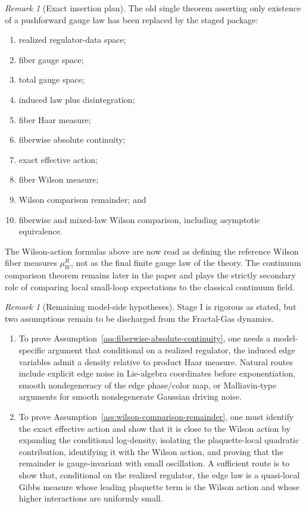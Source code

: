 \documentclass[11pt]{article}
\theoremstyle{definition}
\theoremstyle{remark}
\newtheorem{remark}[theorem]{Remark}
\begin{document}
\begin{remark}[Exact insertion plan]
\label{rem:stage1-insertion-plan}
The old single theorem asserting only existence of a pushforward gauge law has
been replaced by the staged package:
\begin{enumerate}[leftmargin=1.5em,label=\textnormal{(\roman*)}]
\item realized regulator-data space;
\item fiber gauge space;
\item total gauge space;
\item induced law plus disintegration;
\item fiber Haar measure;
\item fiberwise absolute continuity;
\item exact effective action;
\item fiber Wilson measure;
\item Wilson comparison remainder; and
\item fiberwise and mixed-law Wilson comparison, including asymptotic equivalence.
\end{enumerate}
The Wilson-action formulas above are now read as defining the reference Wilson
fiber measures \(\mu_W^R\), not as the final finite gauge law of the theory.
The continuum comparison theorem remains later in the paper and plays the
strictly secondary role of comparing local small-loop expectations to the
classical continuum field.
\end{remark}

\begin{remark}[Remaining model-side hypotheses]
\label{rem:remaining-model-side-hypotheses}
Stage I is rigorous as stated, but two assumptions remain to be discharged from
the Fractal-Gas dynamics.
\begin{enumerate}[leftmargin=1.5em,label=\textnormal{(\roman*)}]
\item To prove Assumption~\ref{ass:fiberwise-absolute-continuity}, one needs a
model-specific argument that conditional on a realized regulator, the induced
edge variables admit a density relative to product Haar measure. Natural routes
include explicit edge noise in Lie-algebra coordinates before exponentiation,
smooth nondegeneracy of the edge phase/color map, or Malliavin-type arguments
for smooth nondegenerate Gaussian driving noise.
\item To prove Assumption~\ref{ass:wilson-comparison-remainder}, one must
identify the exact effective action and show that it is close to the Wilson
action by expanding the conditional log-density, isolating the plaquette-local
quadratic contribution, identifying it with the Wilson action, and proving that
the remainder is gauge-invariant with small oscillation. A sufficient route is
to show that, conditional on the realized regulator, the edge law is a
quasi-local Gibbs measure whose leading plaquette term is the Wilson action and
whose higher interactions are uniformly small.
\end{enumerate}
\end{remark}
\end{document}
